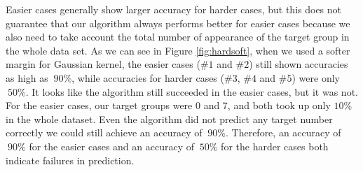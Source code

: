 \documentclass[UTF8,12pt]{article}
\begin{document}
	Easier cases generally show larger accuracy for harder cases, but this does not guarantee that our algorithm always performs better for easier cases because we also need to take account the total number of appearance of the target group in the whole data set. As we can see in Figure \ref{fig:hardsoft}, when we used a softer margin for Gaussian kernel, the easier cases  ($\#1$ and $\#2$) still shown accuracies as high as $~90\%$, while accuracies for harder cases ($\#3$, $\#4$ and $\#5$) were only $~50\%$. It looks like the algorithm still succeeded in the easier cases, but it was not. For the easier cases, our target groups were 0 and 7, and both took up only $10\%$ in the whole dataset. Even the algorithm did not predict any target number correctly we could still achieve an accuracy of $~90\%$. Therefore, an accuracy of $~90\%$ for the easier cases and an accuracy of $~50\%$ for the harder cases both indicate failures in prediction.
	
\end{document}
